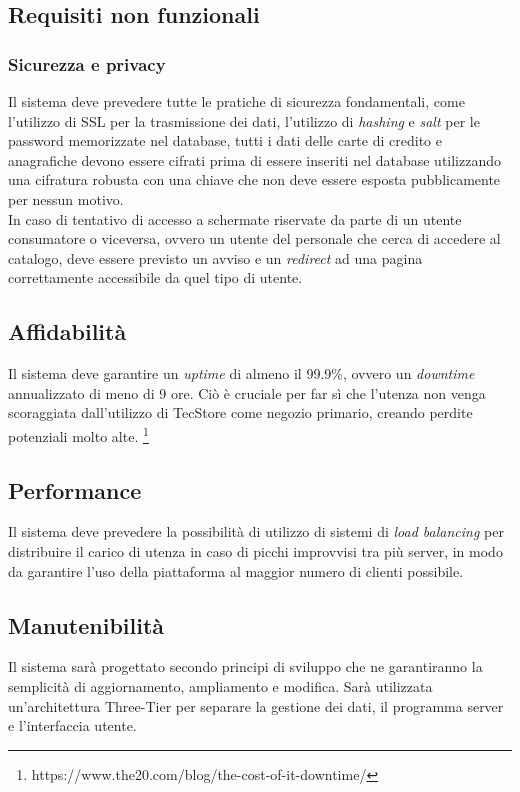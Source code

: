 \documentclass[12pt,a4paper]{article}
\begin{document}
\newpage


\subsection{Requisiti non funzionali}
\subsubsection{Sicurezza e privacy}
Il sistema deve prevedere tutte le pratiche di sicurezza fondamentali, come l'utilizzo di SSL per la trasmissione dei dati, l'utilizzo di \textit{hashing} e \textit{salt} per le password memorizzate nel database, tutti i dati delle carte di credito e anagrafiche devono essere cifrati prima di essere inseriti nel database utilizzando una cifratura robusta con una chiave che non deve essere esposta pubblicamente per nessun motivo. \\
In caso di tentativo di accesso a schermate riservate da parte di un utente consumatore o viceversa, ovvero un utente del personale che cerca di accedere al catalogo, deve essere previsto un avviso e un \textit{redirect} ad una pagina correttamente accessibile da quel tipo di utente.

\subsection{Affidabilità}
Il sistema deve garantire un \emph{uptime} di almeno il 99.9\%, ovvero un \textit{downtime} annualizzato di meno di 9 ore. Ciò è cruciale per far sì che l'utenza non venga scoraggiata dall'utilizzo di TecStore come negozio primario, creando perdite potenziali molto alte. \footnote{https://www.the20.com/blog/the-cost-of-it-downtime/}

\subsection{Performance}
Il sistema deve prevedere la possibilità di utilizzo di sistemi di \textit{load balancing} per distribuire il carico di utenza in caso di picchi improvvisi tra più server, in modo da garantire l'uso della piattaforma al maggior numero di clienti possibile.

\subsection{Manutenibilità}
Il sistema sarà progettato secondo principi di sviluppo che ne garantiranno la semplicità di aggiornamento, ampliamento e modifica.
Sarà utilizzata un'architettura Three-Tier per separare la gestione dei dati, il programma server e l'interfaccia utente.
\end{document}
